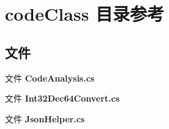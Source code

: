 \section{code\+Class 目录参考}
\label{dir_62cf8e5b0b98733ccae1cf764f7d8426}
\subsection*{文件}
\begin{DoxyCompactItemize}
\item 
文件 \textbf{ Code\+Analysis.\+cs}
\item 
文件 \textbf{ Int32\+Dec64\+Convert.\+cs}
\item 
文件 \textbf{ Json\+Helper.\+cs}
\end{DoxyCompactItemize}

